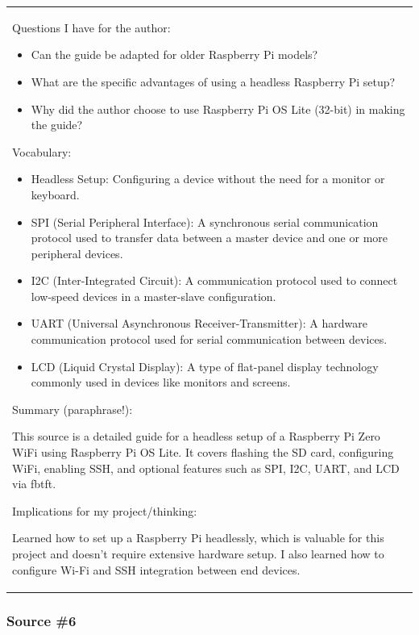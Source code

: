 \begin{longtable}[]{@{}
  >{\raggedright\arraybackslash}p{}@{}}
Questions I have for the author:

\begin{itemize}
\item
  Can the guide be adapted for older Raspberry Pi models?
\item
  What are the specific advantages of using a headless Raspberry Pi
  setup?
\item
  Why did the author choose to use Raspberry Pi OS Lite (32-bit) in
  making the guide?
\end{itemize}


Vocabulary:

\begin{itemize}
\item
  Headless Setup: Configuring a device without the need for a monitor or
  keyboard.
\item
  SPI (Serial Peripheral Interface): A synchronous serial communication
  protocol used to transfer data between a master device and one or more
  peripheral devices.
\item
  I2C (Inter-Integrated Circuit): A communication protocol used to
  connect low-speed devices in a master-slave configuration.
\item
  UART (Universal Asynchronous Receiver-Transmitter): A hardware
  communication protocol used for serial communication between devices.
\item
  LCD (Liquid Crystal Display): A type of flat-panel display technology
  commonly used in devices like monitors and screens.
\end{itemize}


Summary (paraphrase!):

This source is a detailed guide for a headless setup of a Raspberry Pi
Zero WiFi using Raspberry Pi OS Lite. It covers flashing the SD card,
configuring WiFi, enabling SSH, and optional features such as SPI, I2C,
UART, and LCD via fbtft.


Implications for my project/thinking:

Learned how to set up a Raspberry Pi headlessly, which is valuable for
this project and doesn't require extensive hardware setup. I also
learned how to configure Wi-Fi and SSH integration between end devices.

\midrule\noalign{}
\endhead
\bottomrule\noalign{}
\endlastfoot
\end{longtable}

\subsubsection{\texorpdfstring{\hfill\break
\textbf{Source \#6}}{ Source \#6}}\label{source-6}

